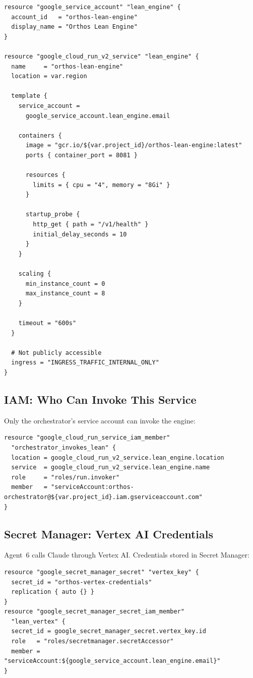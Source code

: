 \documentclass[11pt,a4paper]{article}
\newcommand{\Vertex}{Vertex AI}
\newcommand{\Claude}{Claude}
\begin{document}
\begin{lstlisting}[language=hcl]
resource "google_service_account" "lean_engine" {
  account_id   = "orthos-lean-engine"
  display_name = "Orthos Lean Engine"
}

resource "google_cloud_run_v2_service" "lean_engine" {
  name     = "orthos-lean-engine"
  location = var.region

  template {
    service_account =
      google_service_account.lean_engine.email

    containers {
      image = "gcr.io/${var.project_id}/orthos-lean-engine:latest"
      ports { container_port = 8081 }

      resources {
        limits = { cpu = "4", memory = "8Gi" }
      }

      startup_probe {
        http_get { path = "/v1/health" }
        initial_delay_seconds = 10
      }
    }

    scaling {
      min_instance_count = 0
      max_instance_count = 8
    }

    timeout = "600s"
  }

  # Not publicly accessible
  ingress = "INGRESS_TRAFFIC_INTERNAL_ONLY"
}
\end{lstlisting}

\subsection{IAM: Who Can Invoke This Service}

Only the orchestrator's service account can invoke the engine:

\begin{lstlisting}[language=hcl]
resource "google_cloud_run_service_iam_member"
  "orchestrator_invokes_lean" {
  location = google_cloud_run_v2_service.lean_engine.location
  service  = google_cloud_run_v2_service.lean_engine.name
  role     = "roles/run.invoker"
  member   = "serviceAccount:orthos-orchestrator@${var.project_id}.iam.gserviceaccount.com"
}
\end{lstlisting}

\subsection{Secret Manager: Vertex AI Credentials}

Agent~6 calls \Claude{} through \Vertex{}. Credentials stored in Secret Manager:

\begin{lstlisting}[language=hcl]
resource "google_secret_manager_secret" "vertex_key" {
  secret_id = "orthos-vertex-credentials"
  replication { auto {} }
}
resource "google_secret_manager_secret_iam_member"
  "lean_vertex" {
  secret_id = google_secret_manager_secret.vertex_key.id
  role   = "roles/secretmanager.secretAccessor"
  member = "serviceAccount:${google_service_account.lean_engine.email}"
}
\end{lstlisting}
\end{document}
